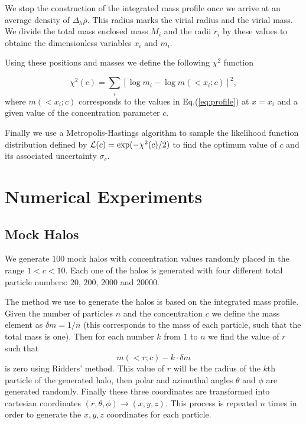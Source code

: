 \documentclass[useAMS,usenatbib]{mn2e}
\begin{document}
We stop the construction of the integrated mass profile once we arrive
at an average density of $\Delta_h\bar{\rho}$. This radius marks the
virial radius and the virial mass. We divide the total mass enclosed
mass $M_i$ and the radii $r_i$ by these values to obtaine the
dimensionless variables $x_i$ and $m_i$. 

Using these positions and masses we define the following $\chi^2$ function

\begin{equation}
\chi^2(c) = \sum_{i}[\log m_i - \log m(< x_i;c)]^2, 
\end{equation}
%
where $m(<x_i;c)$ corresponds to the values in Eq.(\ref{eq:profile}) at
$x=x_i$ and a given value of the concentration parameter $c$.

Finally we use a Metropolis-Hastings algorithm to sample the likelihood
function distribution defined by ${\cal L}(c)=\exp(-\chi^2(c)/2)$ to
find the optimum value of $c$ and its associated uncertainty
$\sigma_c$. 

\section{Numerical Experiments}


\subsection{Mock Halos}

We generate $100$ mock halos with concentration values randomly
placed in the range $1<c<10$. Each one of the halos is generated with
four different total particle numbers: $20$, $200$, $2000$ and $20000$.

The method we use to generate the halos is based on the integrated
mass profile. Given the number of particles $n$ and the concentration $c$ we define the mass element as $\delta m = 1/n$ (this corresponds to the mass of each particle, such that the total mass is one). Then for each number $k$ from $1$ to $n$ we find the value of $r$ such that
\begin{equation}
m(<r;c)-k \cdot \delta m 
\end{equation}
is zero using Ridders' method. This value of $r$ will be the radius of the $k$th particle of the generated halo, then polar and azimuthal angles $\theta$ and $\phi$ are generated randomly. Finally these three coordinates are transformed into cartesian coordinates $(r,\theta,\phi) \rightarrow (x,y,z)$. This process is repeated $n$ times in order to generate the $x,y,z$ coordinates for each particle.
\end{document}
